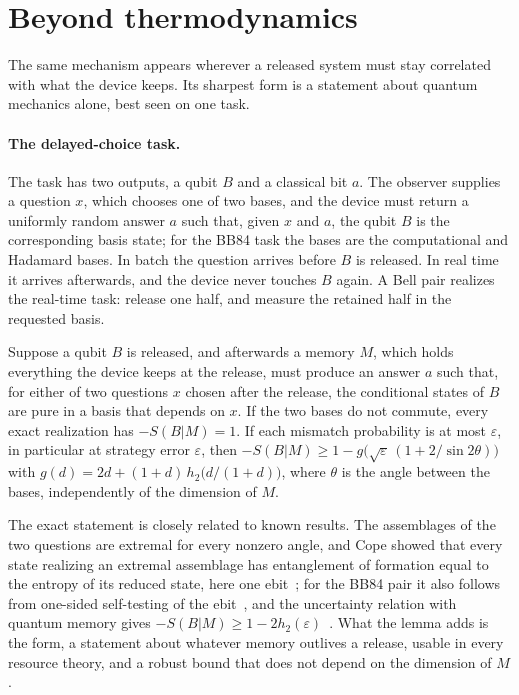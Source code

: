 \section{Beyond thermodynamics}\label{to:sec:beyond}

The same mechanism appears wherever a released system must stay correlated with what the device keeps. Its sharpest form is a statement about quantum mechanics alone, best seen on one task.

\paragraph{The delayed-choice task.} The task has two outputs, a qubit $B$ and a classical bit $a$. The observer supplies a question $x$, which chooses one of two bases, and the device must return a uniformly random answer $a$ such that, given $x$ and $a$, the qubit $B$ is the corresponding basis state; for the BB84 task the bases are the computational and Hadamard bases. In batch the question arrives before $B$ is released. In real time it arrives afterwards, and the device never touches $B$ again. A Bell pair realizes the real-time task: release one half, and measure the retained half in the requested basis.

\begin{lemma}\label{to:lem:release}
Suppose a qubit $B$ is released, and afterwards a memory $M$, which holds everything the device keeps at the release, must produce an answer $a$ such that, for either of two questions $x$ chosen after the release, the conditional states of $B$ are pure in a basis that depends on $x$. If the two bases do not commute, every exact realization has $-S(B|M)=1$. If each mismatch probability is at most $\varepsilon$, in particular at strategy error $\varepsilon$, then $-S(B|M)\ge1-g\bigl(\sqrt\varepsilon\,(1+2/\sin2\theta)\bigr)$ with $g(d)=2d+(1+d)\,h_2\bigl(d/(1+d)\bigr)$, where $\theta$ is the angle between the bases, independently of the dimension of $M$.
\end{lemma}

The exact statement is closely related to known results. The assemblages of the two questions are extremal for every nonzero angle, and Cope showed that every state realizing an extremal assemblage has entanglement of formation equal to the entropy of its reduced state, here one ebit~\cite[Thm.~1]{Cope21}; for the BB84 pair it also follows from one-sided self-testing of the ebit~\cite{SupicHoban16}, and the uncertainty relation with quantum memory gives $-S(B|M)\ge1-2h_2(\varepsilon)$~\cite{BCCRR10}. What the lemma adds is the form, a statement about whatever memory outlives a release, usable in every resource theory, and a robust bound that does not depend on the dimension of $M$.


